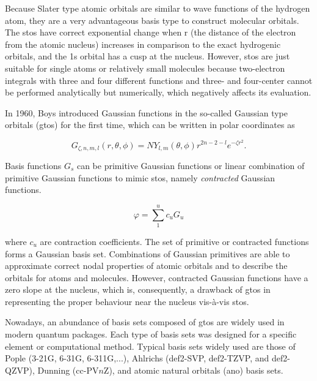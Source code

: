 \begin{refsection}
Because Slater type atomic orbitals are similar to wave functions of the hydrogen atom, they are a very advantageous basis type to construct molecular orbitals. The \acrshort{sto}s have correct exponential change when r (the distance of the electron from the atomic nucleus) increases in comparison to the exact hydrogenic orbitals, and the 1s orbital has a cusp at the nucleus. However, \acrshort{sto}s are just suitable for single atoms or relatively small molecules because two-electron integrals with three and four different functions and three- and four-center cannot be performed analytically but numerically, which negatively affects its evaluation.


In 1960, Boys \cite{c1:boys1950} introduced Gaussian functions in the so-called  Gaussian type orbitals (\acrshort{gto}s) for the first time, which can be written in polar coordinates as

\begin{equation}
G_{\zeta,n,m,l}(r,\theta,\phi) = NY_{l,m}(\theta,\phi)r^{2n-2-l}e^{-\zeta r^2}.
\label{eq:Gaussian_type}
\end{equation}

\noindent Basis functions $G_s$ can be primitive Gaussian functions or linear combination of primitive Gaussian functions to mimic \acrshort{sto}s, namely \textit{contracted} Gaussian functions.  

\begin{equation}
\varphi = \sum_{1}^{u} c_u G_u
\label{eq:contracted_Gaussian}
\end{equation}

\noindent where $c_u$ are contraction coefficients. The set of primitive or contracted functions forms a Gaussian basis set. Combinations of Gaussian primitives are able to approximate correct nodal properties of atomic orbitals and to describe the orbitals for atoms and molecules. However, contracted Gaussian functions have a zero slope at the nucleus, which is, consequently, a drawback of \acrshort{gto}s in representing the proper behaviour near the nucleus vis-\`a-vis \acrshort{sto}s.


Nowadays, an abundance of basis sets composed of \acrshort{gto}s are widely used in modern quantum packages. Each type of basis sets was designed for a specific element or computational method. Typical basis sets widely used are those of Pople (3-21G, 6-31G, 6-311G,...), Ahlrichs (def2-SVP, def2-TZVP, and def2-QZVP), Dunning (cc-PV$n$Z), and atomic natural orbitals (\acrshort{ano}) basis sets.



\end{refsection}
